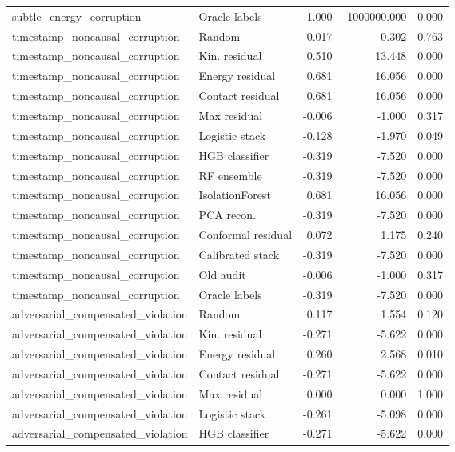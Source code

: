 {\begin{longtable}{llrrr}
subtle\_energy\_corruption & Oracle labels & -1.000 & -1000000.000 & 0.000 \\
timestamp\_noncausal\_corruption & Random & -0.017 & -0.302 & 0.763 \\
timestamp\_noncausal\_corruption & Kin. residual & 0.510 & 13.448 & 0.000 \\
timestamp\_noncausal\_corruption & Energy residual & 0.681 & 16.056 & 0.000 \\
timestamp\_noncausal\_corruption & Contact residual & 0.681 & 16.056 & 0.000 \\
timestamp\_noncausal\_corruption & Max residual & -0.006 & -1.000 & 0.317 \\
timestamp\_noncausal\_corruption & Logistic stack & -0.128 & -1.970 & 0.049 \\
timestamp\_noncausal\_corruption & HGB classifier & -0.319 & -7.520 & 0.000 \\
timestamp\_noncausal\_corruption & RF ensemble & -0.319 & -7.520 & 0.000 \\
timestamp\_noncausal\_corruption & IsolationForest & 0.681 & 16.056 & 0.000 \\
timestamp\_noncausal\_corruption & PCA recon. & -0.319 & -7.520 & 0.000 \\
timestamp\_noncausal\_corruption & Conformal residual & 0.072 & 1.175 & 0.240 \\
timestamp\_noncausal\_corruption & Calibrated stack & -0.319 & -7.520 & 0.000 \\
timestamp\_noncausal\_corruption & Old audit & -0.006 & -1.000 & 0.317 \\
timestamp\_noncausal\_corruption & Oracle labels & -0.319 & -7.520 & 0.000 \\
adversarial\_compensated\_violation & Random & 0.117 & 1.554 & 0.120 \\
adversarial\_compensated\_violation & Kin. residual & -0.271 & -5.622 & 0.000 \\
adversarial\_compensated\_violation & Energy residual & 0.260 & 2.568 & 0.010 \\
adversarial\_compensated\_violation & Contact residual & -0.271 & -5.622 & 0.000 \\
adversarial\_compensated\_violation & Max residual & 0.000 & 0.000 & 1.000 \\
adversarial\_compensated\_violation & Logistic stack & -0.261 & -5.098 & 0.000 \\
adversarial\_compensated\_violation & HGB classifier & -0.271 & -5.622 & 0.000 \\

\end{longtable}}
